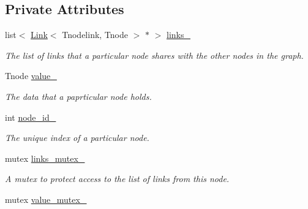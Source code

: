 \subsection*{Private Attributes}
\begin{DoxyCompactItemize}
\item 
\hypertarget{classNode_aff1733d2326817871268b920f5a981ca}{list$<$ \hyperlink{classLink}{Link}$<$ Tnodelink, Tnode $>$ $\ast$ $>$ \hyperlink{classNode_aff1733d2326817871268b920f5a981ca}{links\-\_\-}}\label{classNode_aff1733d2326817871268b920f5a981ca}

\begin{DoxyCompactList}\small\item\em The list of links that a particular node shares with the other nodes in the graph. \end{DoxyCompactList}\item 
\hypertarget{classNode_a78be1747ae96cf39fe2a9ae3be5212a4}{Tnode \hyperlink{classNode_a78be1747ae96cf39fe2a9ae3be5212a4}{value\-\_\-}}\label{classNode_a78be1747ae96cf39fe2a9ae3be5212a4}

\begin{DoxyCompactList}\small\item\em The data that a paprticular node holds. \end{DoxyCompactList}\item 
\hypertarget{classNode_a84fb338de56e4906d251f16bf27ee00f}{int \hyperlink{classNode_a84fb338de56e4906d251f16bf27ee00f}{node\-\_\-id\-\_\-}}\label{classNode_a84fb338de56e4906d251f16bf27ee00f}

\begin{DoxyCompactList}\small\item\em The unique index of a particular node. \end{DoxyCompactList}\item 
\hypertarget{classNode_af75893cb178fdcdd805df2d17c16a88b}{mutex \hyperlink{classNode_af75893cb178fdcdd805df2d17c16a88b}{links\-\_\-mutex\-\_\-}}\label{classNode_af75893cb178fdcdd805df2d17c16a88b}

\begin{DoxyCompactList}\small\item\em A mutex to protect access to the list of links from this node. \end{DoxyCompactList}\item 
\hypertarget{classNode_a846c5acc1ea3bfa722309b5b2ef8072e}{mutex \hyperlink{classNode_a846c5acc1ea3bfa722309b5b2ef8072e}{value\-\_\-mutex\-\_\-}}\label{classNode_a846c5acc1ea3bfa722309b5b2ef8072e}


\end{DoxyCompactItemize}
